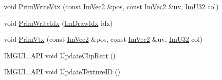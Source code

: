 \begin{DoxyCompactItemize}
\item 
void \mbox{\hyperlink{struct_im_draw_list_af86de4faf6c8e978fb712ea14c5d0c5f}{Prim\+Write\+Vtx}} (const \mbox{\hyperlink{struct_im_vec2}{Im\+Vec2}} \&pos, const \mbox{\hyperlink{struct_im_vec2}{Im\+Vec2}} \&uv, \mbox{\hyperlink{imgui_8h_a118cff4eeb8d00e7d07ce3d6460eed36}{Im\+U32}} col)
\item 
void \mbox{\hyperlink{struct_im_draw_list_a42b72f87a0084c02f11dcd1560c8bbc7}{Prim\+Write\+Idx}} (\mbox{\hyperlink{imgui_8h_afdc8744a5ac1a968b1ddfa47e13b2fa1}{Im\+Draw\+Idx}} idx)
\item 
void \mbox{\hyperlink{struct_im_draw_list_a405377158f0028ad8b4fb6509eef4532}{Prim\+Vtx}} (const \mbox{\hyperlink{struct_im_vec2}{Im\+Vec2}} \&pos, const \mbox{\hyperlink{struct_im_vec2}{Im\+Vec2}} \&uv, \mbox{\hyperlink{imgui_8h_a118cff4eeb8d00e7d07ce3d6460eed36}{Im\+U32}} col)
\item 
\mbox{\hyperlink{imgui_8h_a43829975e84e45d1149597467a14bbf5}{I\+M\+G\+U\+I\+\_\+\+A\+PI}} void \mbox{\hyperlink{struct_im_draw_list_a5978db1fc49be781978699e85c6a3251}{Update\+Clip\+Rect}} ()
\item 
\mbox{\hyperlink{imgui_8h_a43829975e84e45d1149597467a14bbf5}{I\+M\+G\+U\+I\+\_\+\+A\+PI}} void \mbox{\hyperlink{struct_im_draw_list_a58998853ed37538ae5a638da032b0005}{Update\+Texture\+ID}} ()
\end{DoxyCompactItemize}
